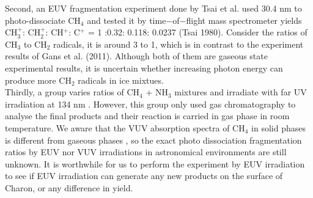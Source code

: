 Second, an EUV fragmentation experiment done by Tsai et al. \cite{tsai1980mass} used 30.4 nm to photo-dissociate CH$_4$ and tested it by time$-$of$-$flight mass spectrometer yields CH$_3^+$: CH$_2^+$: CH$^+$: C$^+$ = 1 :0.32: 0.118: 0.0237 (Tsai 1980). Consider the ratios of CH$_3$ to CH$_2$ radicals, it is around 3 to 1, which is in contrast to the experiment results of Gans et al. (2011)\cite{gans2011photolysis}. Although both of them are gaseous state experimental results, it is uncertain whether increasing photon energy can produce more CH$_2$ radicals in ice mixtues.\\

Thirdly, a group varies ratios of CH$_4$ + NH$_3$ mixtures and irradiate with far UV irradiation at 134 nm \cite{bossard1980far}. However, this group only used gas chromatography to analyse the final products and their reaction is carried in gas phase in room temperature. We aware that the VUV absorption spectra of CH$_4$ in solid phases is different from gaseous phases \cite{cruz2014vacuum}, so the exact photo dissociation fragmentation ratios by EUV nor VUV irradiations in astronomical environments are still unknown. It is worthwhile for us to perform the experiment by EUV irradiation to see if  EUV irradiation can generate any new products on the surface of Charon, or any difference in yield.\\

